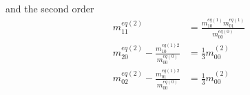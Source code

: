 and the second order
\begin{equation}
  \begin{aligned}
    m_{11}^{eq(2)} & = \frac{ m_{10}^{eq(1)}m_{01}^{eq(1)}}{m_{00}^{eq(0)}} \\
    m_{20}^{eq(2)} - \frac{ m_{10}^{eq(1)2}}{m_{00}^{eq(0)}} & = \frac{1}{3} m_{00}^{(2)} \\
    m_{02}^{eq(2)} - \frac{ m_{01}^{eq(1)2}}{m_{00}^{eq(0)}} & = \frac{1}{3} m_{00}^{(2)}
  \end{aligned}
\end{equation}
